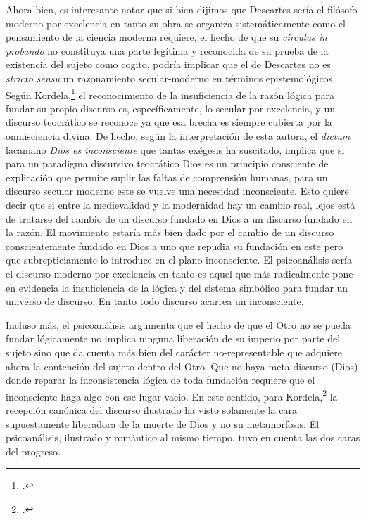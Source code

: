 Ahora bien, es interesante notar que si bien dijimos que Descartes sería el filósofo moderno por excelencia en tanto su obra se organiza sistemáticamente como el pensamiento de la ciencia moderna requiere, el hecho de que su \emph{circulus in probando} no constituya una parte legítima y reconocida de su prueba de la existencia del sujeto como cogito, podría implicar que el de Descartes no es \emph{stricto sensu} un razonamiento secular-moderno en términos epistemológicos. Según Kordela,\footcite[][789-839]{@7119-KORDELA1999} el reconocimiento de la insuficiencia de la razón lógica para fundar su propio discurso es, específicamente, lo secular por excelencia, y un discurso teocrático se reconoce ya que esa brecha es siempre cubierta por la omnisciencia divina. De hecho, según la interpretación de esta autora, el \textit{dictum} lacaniano \emph{Dios es inconsciente} que tantas exégesis ha suscitado, implica que si para un paradigma discursivo teocrático Dios es un principio consciente de explicación que permite suplir las faltas de comprensión humanas, para un discurso secular moderno este se vuelve una necesidad inconsciente. Esto quiere decir que si entre la medievalidad y la modernidad hay un cambio real, lejos está de tratarse del cambio de un discurso fundado en Dios a un discurso fundado en la razón. El movimiento estaría más bien dado por el cambio de un discurso conscientemente fundado en Dios a uno que repudia su fundación en este pero que subrepticiamente lo introduce en el plano inconsciente. El psicoanálisis sería el discurso moderno por excelencia en tanto es aquel que más radicalmente pone en evidencia la insuficiencia de la lógica y del sistema simbólico para fundar un universo de discurso. En tanto todo discurso acarrea un inconsciente.

Incluso más, el psicoanálisis argumenta que el hecho de que el Otro no se pueda fundar lógicamente no implica ninguna liberación de su imperio por parte del sujeto sino que da cuenta más bien del carácter no-representable que adquiere ahora la contención del sujeto dentro del Otro. Que no haya meta-discurso (Dios) donde reparar la inconsistencia lógica de toda fundación requiere que el inconsciente haga algo con ese lugar vacío. En este sentido, para Kordela,\footcite[][793]{@7119-KORDELA1999} la recepción canónica del discurso ilustrado ha visto solamente la cara supuestamente liberadora de la muerte de Dios y no su metamorfosis. El psicoanálisis, ilustrado y romántico al mismo tiempo, tuvo en cuenta las dos caras del progreso.

